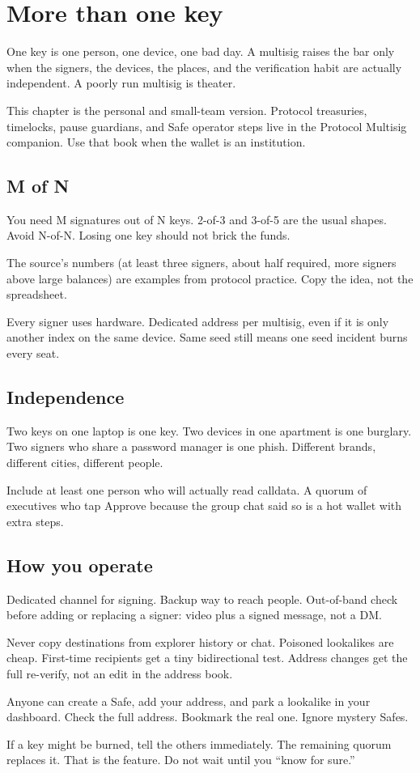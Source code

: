 \chapter{More than one key}

One key is one person, one device, one bad day. A
multisig raises the bar only when the signers, the
devices, the places, and the verification habit are
actually independent. A poorly run multisig is theater.

This chapter is the personal and small-team version.
Protocol treasuries, timelocks, pause guardians, and
Safe operator steps live in the Protocol Multisig
companion. Use that book when the wallet is an
institution.

\section{M of N}

You need M signatures out of N keys. 2-of-3 and 3-of-5
are the usual shapes. Avoid N-of-N. Losing one key
should not brick the funds.

The source's numbers (at least three signers, about half
required, more signers above large balances) are
examples from protocol practice. Copy the idea, not the
spreadsheet.

Every signer uses hardware. Dedicated address per
multisig, even if it is only another index on the same
device. Same seed still means one seed incident burns
every seat.

\section{Independence}

Two keys on one laptop is one key. Two devices in one
apartment is one burglary. Two signers who share a
password manager is one phish. Different brands, different
cities, different people.

Include at least one person who will actually read
calldata. A quorum of executives who tap Approve because
the group chat said so is a hot wallet with extra
steps.

\section{How you operate}

Dedicated channel for signing. Backup way to reach
people. Out-of-band check before adding or replacing a
signer: video plus a signed message, not a DM.

Never copy destinations from explorer history or chat.
Poisoned lookalikes are cheap. First-time recipients get
a tiny bidirectional test. Address changes get the full
re-verify, not an edit in the address book.

Anyone can create a Safe, add your address, and park a
lookalike in your dashboard. Check the full address.
Bookmark the real one. Ignore mystery Safes.

If a key might be burned, tell the others immediately.
The remaining quorum replaces it. That is the feature.
Do not wait until you ``know for sure.''
